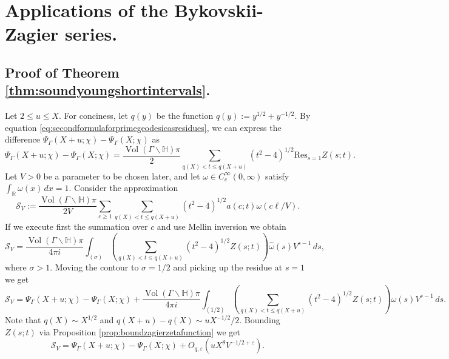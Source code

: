 \documentclass{article}
\theoremstyle{named}
\renewcommand{\S}{\mathcal{S}}
\newcommand{\Hyp}{\mathbb{H}}
\newcommand{\R}{\mathbb{R}}
\DeclareMathOperator{\vol}{Vol}
\begin{document}
\section{Applications of the Bykovskii-Zagier series.}\label{sec:shortintervals}

\subsection{Proof of Theorem \ref{thm:soundyoungshortintervals}.}\label{subsec:shortintervals}

Let $2 \leq u \leq X$. For conciness, let $q(y)$ be the function $q(y) := y^{1/2} + y^{-1/2}$. By equation \eqref{eq:secondformulaforprimegeodesicasresidues}, we can express the difference $\Psi_\Gamma(X + u; \chi) - \Psi_\Gamma(X; \chi)$ as
\begin{equation*}
    \Psi_\Gamma(X + u; \chi) - \Psi_\Gamma(X; \chi) = \frac{\vol(\Gamma\backslash \Hyp)\pi}{2}\sum_{q(X) < t \leq q(X + u)} (t^2 - 4)^{1/2}\text{Res}_{s = 1}Z(s; t).
\end{equation*}
Let $V > 0$ be a parameter to be chosen later, and let $\omega \in C_c^\infty(0, \infty)$ satisfy $\int_\R \omega(x) \, dx = 1$. Consider the approximation 
\begin{equation}\label{eq:approximationtogeometricsideshortintervals}
    \S_V := \frac{\vol(\Gamma\backslash \Hyp)\pi}{2V}\sum_{c\geq 1}\sum_{q(X) < t \leq q(X + u)} (t^2 - 4)^{1/2} a(c; t)\omega(c \ell/V).
\end{equation}
If we execute first the summation over $c$ and use Mellin inversion we obtain
\begin{equation*}
    \S_V = \frac{\vol(\Gamma\backslash \Hyp)\pi}{4\pi i}\int_{(\sigma)} \left(\sum_{q(X) < t \leq q(X + u)} (t^2 - 4)^{1/2}Z(s; t)\right) \widehat{\omega}(s)V^{s-1}\, ds,
\end{equation*}
where $\sigma > 1$. Moving the contour to $\sigma = 1/2$ and picking up the residue at $s = 1$ we get
\begin{equation*}
    \S_V =  \Psi_\Gamma(X + u; \chi) - \Psi_\Gamma(X; \chi)  + \frac{\vol(\Gamma\backslash \Hyp)\pi}{4\pi i}\int_{(1/2)} \left(\sum_{q(X) < t \leq q(X + u)} (t^2 - 4)^{1/2}Z(s; t)\right) \widehat{\omega}(s)V^{s-1}\, ds.
\end{equation*}
Note that $q(X) \sim X^{1/2}$ and $q(X + u) - q(X) \sim uX^{-1/2}/2$. Bounding $Z(s; t)$ via Proposition \ref{prop:boundzagierzetafunction} we get
\begin{equation}\label{eq:shortintervalssumoverc}
    \S_V = \Psi_\Gamma(X + u; \chi) - \Psi_\Gamma(X; \chi) + O_{q, \varepsilon}(u X^\theta V^{-1/2 + \varepsilon}).
\end{equation}
\end{document}
